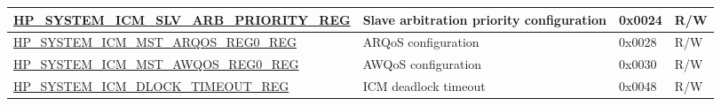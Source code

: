 \begin{longtable}{ | L{8.2cm} | L{6cm} | l | L{1.2cm} | }
\hyperref[regdesc:HPSYSTEMICMSLVARBPRIORITYREG]{HP\_SYSTEM\_ICM\_SLV\_ARB\_PRIORITY\_REG} & Slave arbitration priority configuration & 0x0024 & R/W \\ \hline
\hyperref[regdesc:HPSYSTEMICMMSTARQOSREG0REG]{HP\_SYSTEM\_ICM\_MST\_ARQOS\_REG0\_REG} & ARQoS configuration & 0x0028 & R/W \\ \hline
\hyperref[regdesc:HPSYSTEMICMMSTAWQOSREG0REG]{HP\_SYSTEM\_ICM\_MST\_AWQOS\_REG0\_REG} & AWQoS configuration & 0x0030 & R/W \\ \hline
\hyperref[regdesc:HPSYSTEMICMDLOCKTIMEOUTREG]{HP\_SYSTEM\_ICM\_DLOCK\_TIMEOUT\_REG} & ICM deadlock timeout & 0x0048 & R/W \\ \hline
\end{longtable}